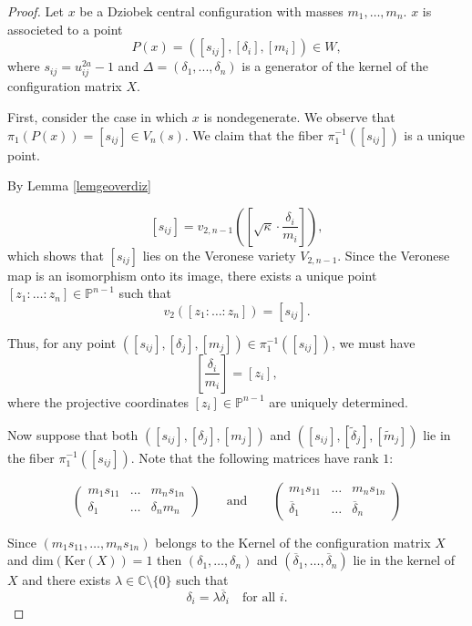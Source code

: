 \documentclass[10pt,a4paper]{amsart}
\begin{document}
\begin{proof}
Let $x$ be a Dziobek central configuration with masses $m_1, \dots, m_n$. $x$ is associeted to a point
\[
P(x) = ([s_{ij}], [\delta_i], [m_i]) \in W,
\]
where $s_{ij} = u_{ij}^{2a} - 1$ and   $\Delta=(\delta_1,...,\delta_n)$ is a generator of the kernel of the configuration matrix $X$.

First, consider the case in which $x$ is nondegenerate. We observe that $ \pi_1(P(x))=[s_{ij}]\in V_{n}(s)$. We claim that the fiber $\pi_1^{-1}([s_{ij}])$ is a unique point.




By Lemma \ref{lemgeoverdiz}

\[
[s_{ij}] = v_{2,n-1}\left( \left[ \sqrt{\kappa} \cdot \frac{\delta_i}{m_i} \right] \right),
\]
which shows that $[s_{ij}]$ lies on the Veronese variety $V_{2,n-1}$. Since the Veronese map is an isomorphism onto its image, there exists a unique point $[z_1 : \dots : z_n] \in \mathbb{P}^{n-1}$ such that
\[
v_2([z_1 : \dots : z_n]) = [s_{ij}].
\]

Thus, for any point $([s_{ij}], [\delta_j], [m_j]) \in \pi_1^{-1}([s_{ij}])$, we must have
\[
\left[ \frac{\delta_i}{m_i} \right] = [z_i],
\]
where the projective coordinates $[z_i] \in \mathbb{P}^{n-1}$ are uniquely determined.

Now suppose that both $([s_{ij}], [\delta_j], [m_j])$ and $([s_{ij}], [\tilde{\delta}_j], [\tilde{m}_j])$ lie in the fiber $\pi_1^{-1}([s_{ij}])$. Note that the following matrices have rank $1$:


$$\begin{pmatrix}
    m_1s_{11} & \dots & m_ns_{1n} \\
    \delta_1 & \dots & \delta_n{m_n}
\end{pmatrix}  \qquad \text{and} \qquad \begin{pmatrix}
    m_1s_{11} & \dots & m_ns_{1n} \\
     \overline{\delta}_1 & \dots &  \overline{\delta}_n
\end{pmatrix}  $$



Since $(m_1s_{11},  \dots  ,m_ns_{1n})$ belongs to the Kernel of the configuration matrix $X$ and $\text{dim}(\text{Ker}(X))=1$ then $(\delta_1, \dots, \delta_n)$ and $(\overline{\delta}_1, \dots, \overline{\delta}_n)$ lie in the kernel of $X$ and there exists $\lambda \in \mathbb{C}\setminus\{0\}$ such that
\[
\delta_i = \lambda \overline{\delta}_i \quad \text{for all } i.
\]


\end{proof}
\end{document}
